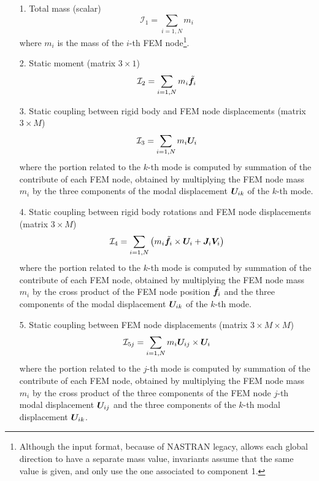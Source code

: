 \begin{enumerate}
\item[1.] Total mass
(scalar)
\begin{equation}
	\mathcal{I}_1 = \sum_{i=1,N} m_i
\end{equation}
where $m_i$ is the mass of the $i$-th FEM node\footnote{Although the input
format, because of NASTRAN legacy, allows each global direction to have
a separate mass value, invariants assume that the same value is given,
and only use the one associated to component 1.}.

\item[2.] Static moment
(matrix $3\times{1}$)
\begin{equation}
	\mathcal{I}_2 = \sum_{i=1,N} m_i \tilde{\bm{f}}_i
\end{equation}

\item[3.] Static coupling between rigid body and FEM node displacements
(matrix $3\times{M}$)
\begin{equation}
	\mathcal{I}_3 = \sum_{i=1,N} m_i \bm{U}_i
\end{equation}
where the portion related to the $k$-th mode is computed by summation
of the contribute of each FEM node, obtained by multiplying the FEM node
mass $m_i$ by the three components of the modal displacement $\bm{U}_{ik}$
of the $k$-th mode.

\item[4.] Static coupling between rigid body rotations and FEM node 
displacements
(matrix $3\times{M}$)
\begin{equation}
	\mathcal{I}_4 = \sum_{i=1,N} \left( 
		m_i \tilde{\bm{f}}_i \times \bm{U}_i
		+ \bm{J}_i \bm{V}_i
	 \right)
\end{equation}
where the portion related to the $k$-th mode is computed by summation
of the contribute of each FEM node, obtained by multiplying the FEM node
mass $m_i$ by the cross product of the FEM node position $\tilde{\bm{f}}_i$ 
and the three components of the modal displacement $\bm{U}_{ik}$ of the
$k$-th mode.

\item[5.] Static coupling between FEM node displacements
(matrix $3\times{M}\times{M}$)
\begin{equation}
	\mathcal{I}_{5j} = \sum_{i=1,N} m_i \bm{U}_{ij} \times \bm{U}_i
\end{equation}
where the portion related to the $j$-th mode is computed by summation
of the contribute of each FEM node, obtained by multiplying the FEM node
mass $m_i$ by the cross product of the three components of the FEM node 
$j$-th modal displacement $\bm{U}_{ij}$ and the three components of the 
$k$-th modal displacement $\bm{U}_{ik}$.


\end{enumerate}
